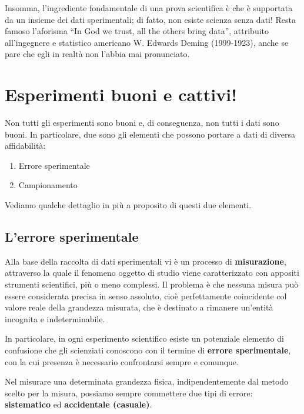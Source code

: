 \documentclass[a4paper,12pt,oneside]{book}
\providecommand{\tightlist}{%
  \setlength{\itemsep}{0pt}\setlength{\parskip}{0pt}}
\theoremstyle{definition}
\theoremstyle{definition}
\theoremstyle{definition}
\theoremstyle{remark}
\begin{document}
Insomma, l'ingrediente fondamentale di una prova scientifica è che è
supportata da un insieme dei dati sperimentali; di fatto, non esiste
scienza senza dati! Resta famoso l'aforisma ``In God we trust, all the
others bring data'', attribuito all'ingegnere e statistico americano W.
Edwards Deming (1999-1923), anche se pare che egli in realtà non l'abbia
mai pronunciato.

\section{Esperimenti buoni e
cattivi!}\label{esperimenti-buoni-e-cattivi}

Non tutti gli esperimenti sono buoni e, di conseguenza, non tutti i dati
sono buoni. In particolare, due sono gli elementi che possono portare a
dati di diversa affidabilità:

\begin{enumerate}
\def\labelenumi{\arabic{enumi}.}
\tightlist
\item
  Errore sperimentale
\item
  Campionamento
\end{enumerate}

Vediamo qualche dettaglio in più a proposito di questi due elementi.

\subsection{L'errore sperimentale}\label{lerrore-sperimentale}

Alla base della raccolta di dati sperimentali vi è un processo di
\textbf{misurazione}, attraverso la quale il fenomeno oggetto di studio
viene caratterizzato con appositi strumenti scientifici, più o meno
complessi. Il problema è che nessuna misura può essere considerata
precisa in senso assoluto, cioè perfettamente coincidente col valore
reale della grandezza misurata, che è destinato a rimanere un'entità
incognita e indeterminabile.

In particolare, in ogni esperimento scientifico esiste un potenziale
elemento di confusione che gli scienziati conoscono con il termine di
\textbf{errore sperimentale}, con la cui presenza è necessario
confrontarsi sempre e comunque.

Nel misurare una determinata grandezza fisica, indipendentemente dal
metodo scelto per la misura, possiamo sempre commettere due tipi di
errore: \textbf{sistematico} ed \textbf{accidentale (casuale)}.
\end{document}
